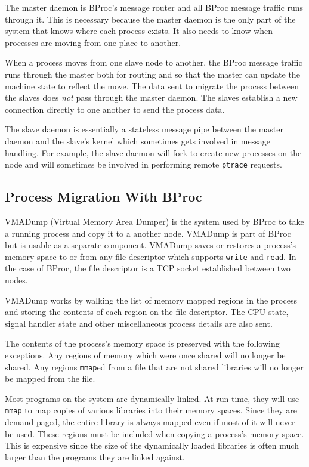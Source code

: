 The master daemon is BProc's message router and all BProc message
traffic runs through it.  This is necessary because the master daemon
is the only part of the system that knows where each process exists.
It also needs to know when processes are moving from one place to
another.

When a process moves from one slave node to another, the BProc message
traffic runs through the master both for routing and so that the
master can update the machine state to reflect the move.  The data
sent to migrate the process between the slaves does \emph{not} pass
through the master daemon.  The slaves establish a new connection
directly to one another to send the process data.

The slave daemon is essentially a stateless message pipe between the
master daemon and the slave's kernel which sometimes gets involved in
message handling.  For example, the slave daemon will fork to create
new processes on the node and will sometimes be involved in performing
remote \texttt{ptrace} requests.

\subsection{Process Migration With BProc}

VMADump (Virtual Memory Area Dumper) is the system used by BProc to
take a running process and copy it to a another node.  VMADump is part
of BProc but is usable as a separate component.  VMADump saves or
restores a process's memory space to or from any file descriptor which
supports \texttt{write} and \texttt{read}.  In the case of BProc, the
file descriptor is a TCP socket established between two nodes.

VMADump works by walking the list of memory mapped regions in the
process and storing the contents of each region on the file
descriptor.  The CPU state, signal handler state and other
miscellaneous process details are also sent.

The contents of the process's memory space is preserved with the
following exceptions.  Any regions of memory which were once shared
will no longer be shared.  Any regions \texttt{mmap}ed from a file
that are not shared libraries will no longer be mapped from the file.

Most programs on the system are dynamically linked.  At run time, they
will use \texttt{mmap} to map copies of various libraries into their
memory spaces.  Since they are demand paged, the entire library is
always mapped even if most of it will never be used.  These regions
must be included when copying a process's memory space.  This is
expensive since the size of the dynamically loaded libraries is
often much larger than the programs they are linked against.

